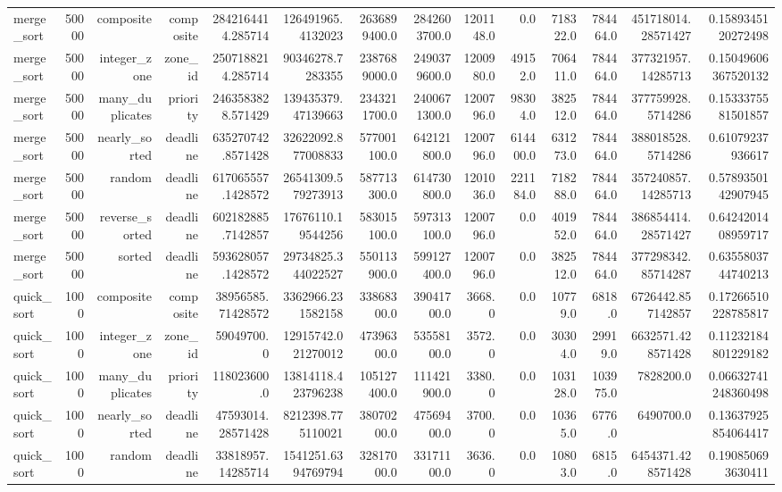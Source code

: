 \begin{table}[htbp]
\begin{tabular}{lrrrrrrrrrrrrr}
merge_sort & 50000 & composite & composite & 2842164414.285714 & 126491965.4132023 & 2636899400.0 & 2842603700.0 & 1201148.0 & 0.0 & 718322.0 & 784464.0 & 451718014.28571427 & 0.1589345120272498 \\
merge_sort & 50000 & integer_zone & zone_id & 2507188214.285714 & 90346278.7283355 & 2387689000.0 & 2490379600.0 & 1200980.0 & 49152.0 & 706411.0 & 784464.0 & 377321957.14285713 & 0.15049606367520132 \\
merge_sort & 50000 & many_duplicates & priority & 2463583828.571429 & 139435379.47139663 & 2343211700.0 & 2400671300.0 & 1200796.0 & 98304.0 & 382512.0 & 784464.0 & 377759928.5714286 & 0.1533375581501857 \\
merge_sort & 50000 & nearly_sorted & deadline & 635270742.8571428 & 32622092.877008833 & 577001100.0 & 642121800.0 & 1200796.0 & 614400.0 & 631273.0 & 784464.0 & 388018528.5714286 & 0.61079237936617 \\
merge_sort & 50000 & random & deadline & 617065557.1428572 & 26541309.579273913 & 587713300.0 & 614730800.0 & 1201036.0 & 221184.0 & 718288.0 & 784464.0 & 357240857.14285713 & 0.5789350142907945 \\
merge_sort & 50000 & reverse_sorted & deadline & 602182885.7142857 & 17676110.19544256 & 583015100.0 & 597313100.0 & 1200796.0 & 0.0 & 401952.0 & 784464.0 & 386854414.28571427 & 0.6424201408959717 \\
merge_sort & 50000 & sorted & deadline & 593628057.1428572 & 29734825.344022527 & 550113900.0 & 599127400.0 & 1200796.0 & 0.0 & 382512.0 & 784464.0 & 377298342.85714287 & 0.6355803744740213 \\
quick_sort & 1000 & composite & composite & 38956585.71428572 & 3362966.231582158 & 33868300.0 & 39041700.0 & 3668.0 & 0.0 & 10779.0 & 6818.0 & 6726442.857142857 & 0.17266510228785817 \\
quick_sort & 1000 & integer_zone & zone_id & 59049700.0 & 12915742.021270012 & 47396300.0 & 53558100.0 & 3572.0 & 0.0 & 30304.0 & 29919.0 & 6632571.428571428 & 0.11232184801229182 \\
quick_sort & 1000 & many_duplicates & priority & 118023600.0 & 13814118.423796238 & 105127400.0 & 111421900.0 & 3380.0 & 0.0 & 103128.0 & 103975.0 & 7828200.0 & 0.06632741248360498 \\
quick_sort & 1000 & nearly_sorted & deadline & 47593014.28571428 & 8212398.775110021 & 38070200.0 & 47569400.0 & 3700.0 & 0.0 & 10365.0 & 6776.0 & 6490700.0 & 0.13637925854064417 \\
quick_sort & 1000 & random & deadline & 33818957.14285714 & 1541251.6394769794 & 32817000.0 & 33171100.0 & 3636.0 & 0.0 & 10803.0 & 6815.0 & 6454371.428571428 & 0.190850693630411 \\

\end{tabular}
\end{table}
